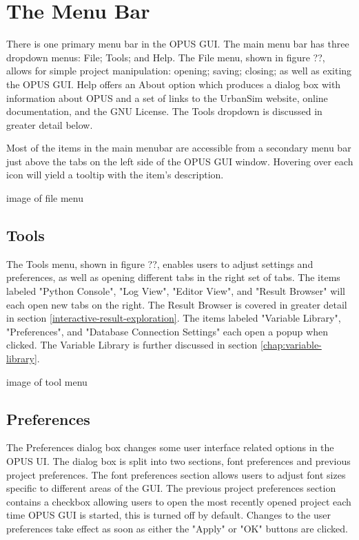 \chapter{The Menu Bar}

There is one primary menu bar in the OPUS GUI.  The main menu bar has three dropdown menus: File; Tools; and Help.  The File menu, shown in figure ??, allows for simple project manipulation: opening; saving; closing; as well as exiting the OPUS GUI.  Help offers an About option which produces a dialog box with information about OPUS and a set of links to the UrbanSim website, online documentation, and the GNU License.  The Tools dropdown is discussed in greater detail below.

Most of the items in the main menubar are accessible from a secondary menu bar just above the tabs on the left side of the OPUS GUI window.  Hovering over each icon will yield a tooltip with the item's description.

image of file menu

\section{Tools}

The Tools menu, shown in figure ??, enables users to adjust settings and preferences, as well as opening different tabs in the right set of tabs.  The items labeled "Python Console", "Log View", "Editor View", and "Result Browser" will each open new tabs on the right.  The Result Browser is covered in greater detail in section \ref{interactive-result-exploration}.  The items labeled "Variable Library", "Preferences", and "Database Connection Settings" each open a popup when clicked.  The Variable Library is further discussed in section \ref{chap:variable-library}.

image of tool menu

\section{Preferences}

The Preferences dialog box changes some user interface related options in the OPUS UI.  The dialog box is split into two sections, font preferences and previous project preferences.  The font preferences section allows users to adjust font sizes specific to different areas of the GUI.  The previous project preferences section contains a checkbox allowing users to open the most recently opened project each time OPUS GUI is started, this is turned off by default.  Changes to the user preferences take effect as soon as either the "Apply" or "OK" buttons are clicked.

